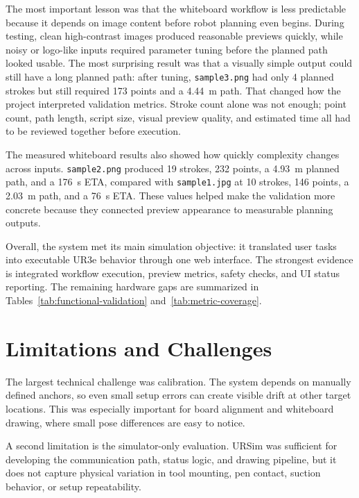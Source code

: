 \documentclass[12pt]{article}
\begin{document}
The most important lesson was that the whiteboard workflow is less predictable because it depends on image content before robot planning even begins. During testing, clean high-contrast images produced reasonable previews quickly, while noisy or logo-like inputs required parameter tuning before the planned path looked usable. The most surprising result was that a visually simple output could still have a long planned path: after tuning, \texttt{sample3.png} had only 4 planned strokes but still required 173 points and a 4.44~m path. That changed how the project interpreted validation metrics. Stroke count alone was not enough; point count, path length, script size, visual preview quality, and estimated time all had to be reviewed together before execution.

The measured whiteboard results also showed how quickly complexity changes across inputs. \texttt{sample2.png} produced 19 strokes, 232 points, a 4.93~m planned path, and a 176~s ETA, compared with \texttt{sample1.jpg} at 10 strokes, 146 points, a 2.03~m path, and a 76~s ETA. These values helped make the validation more concrete because they connected preview appearance to measurable planning outputs.

Overall, the system met its main simulation objective: it translated user tasks into executable UR3e behavior through one web interface. The strongest evidence is integrated workflow execution, preview metrics, safety checks, and UI status reporting. The remaining hardware gaps are summarized in Tables~\ref{tab:functional-validation} and~\ref{tab:metric-coverage}.

\section{Limitations and Challenges}
The largest technical challenge was calibration. The system depends on manually defined anchors, so even small setup errors can create visible drift at other target locations. This was especially important for board alignment and whiteboard drawing, where small pose differences are easy to notice.

A second limitation is the simulator-only evaluation. URSim was sufficient for developing the communication path, status logic, and drawing pipeline, but it does not capture physical variation in tool mounting, pen contact, suction behavior, or setup repeatability.
\end{document}
